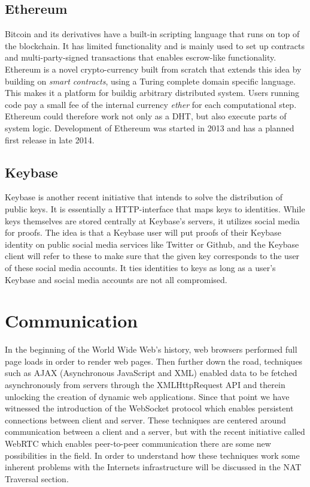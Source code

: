 \subsection{Ethereum}
Bitcoin and its derivatives have a built-in scripting language that runs on top of the blockchain. It has limited functionality and is mainly used to set up contracts and multi-party-signed transactions that enables escrow-like functionality. Ethereum\cite{Ethereum:Online} is a novel crypto-currency built from scratch that extends this idea by building on \emph{smart contracts}, using a Turing complete domain specific language. This makes it a platform for buildig arbitrary distributed system. Users running code pay a small fee of the internal currency \emph{ether} for each computational step. Ethereum could therefore work not only as a DHT, but also execute parts of system logic. Development of Ethereum was started in 2013 and has a planned first release in late 2014.

\subsection{Keybase}
Keybase \cite{Keybase:Online} is another recent initiative that intends to solve the distribution of public keys. It is essentially a HTTP-interface that maps keys to identities. While keys themselves are stored centrally at Keybase's servers, it utilizes social media for proofs. The idea is that a Keybase user will put proofs of their Keybase identity on public social media services like Twitter or Github, and the Keybase client will refer to these to make sure that the given key corresponds to the user of these social media accounts. It ties identities to keys as long as a user's Keybase and social media accounts are not all compromised.

\section{Communication}
In the beginning of the World Wide Web's history, web browsers performed full page loads in order to render web pages. Then further down the road, techniques such as AJAX (Asynchronous JavaScript and XML) enabled data to be fetched asynchronously from servers through the XMLHttpRequest API and therein unlocking the creation of dynamic web applications. Since that point we have witnessed the introduction of the WebSocket protocol which enables persistent connections between client and server. These techniques are centered around communication between a client and a server, but with the recent initiative called WebRTC which enables peer-to-peer communication there are some new possibilities in the field. In order to understand how these techniques work some inherent problems with the Internets infrastructure will be discussed in the NAT Traversal section.

